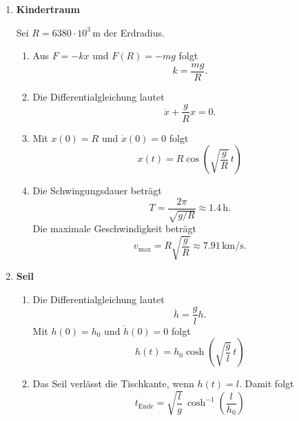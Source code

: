 \begin{enumerate}
    \item \textbf{Kindertraum}

          Sei \(R=6380\cdot 10^3\,\mathrm{m}\) der Erdradius.
          \begin{enumerate}
              \item Aus \(F=-kx\) und \(F(R)=-mg\) folgt
                    \[
                        k=\frac{mg}{R}.
                    \]

              \item Die Differentialgleichung lautet
                    \[
                        \ddot{x}+\frac{g}{R}x=0.
                    \]

              \item Mit \(x(0)=R\) und \(\dot{x}(0)=0\) folgt
                    \[
                        \boxed{
                            x(t)=R\cos\left(\sqrt{\frac{g}{R}}\,t\right)
                        }
                    \]

              \item Die Schwingungsdauer beträgt
                    \[
                        T=\frac{2\pi}{\sqrt{g/R}}
                        \approx 1.4\,\mathrm{h}.
                    \]
                    Die maximale Geschwindigkeit beträgt
                    \[
                        v_{\max}=R\sqrt{\frac{g}{R}}
                        \approx 7.91\,\mathrm{km/s}.
                    \]
          \end{enumerate}

    \item \textbf{Seil}

          \begin{enumerate}
              \item Die Differentialgleichung lautet
                    \[
                        \ddot{h}=\frac{g}{l}h.
                    \]
                    Mit \(h(0)=h_0\) und \(\dot{h}(0)=0\) folgt
                    \[
                        \boxed{
                            h(t)=h_0\cosh\left(\sqrt{\frac{g}{l}}\,t\right)
                        }
                    \]

              \item Das Seil verlässt die Tischkante, wenn \(h(t)=l\).
                    Damit folgt
                    \[
                        \boxed{
                            t_{\mathrm{Ende}}
                            =\sqrt{\frac{l}{g}}\,
                            \cosh^{-1}\left(\frac{l}{h_0}\right)
                        }
                    \]


\end{enumerate}
\end{enumerate}
